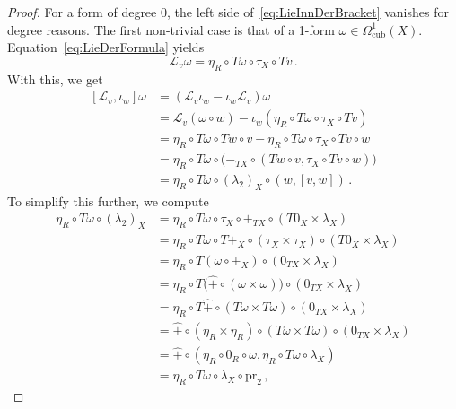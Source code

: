 \documentclass[12pt,reqno, a4paper]{amsart}
\numberwithin{equation}{section}
\theoremstyle{plain}
\theoremstyle{definition}
\theoremstyle{remark}
\newcommand{\pr}{\mathrm{pr}}
\newcommand{\Lie}{\mathcal{L}}
\newcommand{\Val}{\eta}
\newcommand{\Radd}{\hat{+}}
\begin{document}
\begin{proof}
For a form of degree $0$, the left side of~\eqref{eq:LieInnDerBracket} vanishes for degree reasons. The first non-trivial case is that of a 1-form $\omega \in \Omega^1_\mathrm{cub}(X)$. Equation~\eqref{eq:LieDerFormula} yields
\begin{equation*}
  \Lie_v \omega
  =  \Val_R \circ T\omega \circ \tau_X \circ Tv
  \,.
\end{equation*}
With this, we get
\begin{equation}
\label{eq:LieInnDerBrack03}
\begin{split}
  [\Lie_v, \iota_w]\omega
  &=
  (\Lie_v \iota_w - \iota_w \Lie_v)\omega
  \\
  &=
  \Lie_v (\omega \circ w)
  - \iota_w (\Val_R \circ T\omega \circ \tau_X \circ Tv)
  \\
  &=
    \Val_R \circ T\omega \circ Tw \circ v
  - \Val_R \circ T\omega \circ \tau_X \circ Tv \circ w
  \\
  &=
    \Val_R \circ T\omega \circ \bigl(
    -_{TX} \circ (Tw \circ v, \tau_X \circ Tv \circ w)
    \bigr)
  \\
  &=
    \Val_R \circ T\omega \circ (\lambda_2)_X \circ
    (w, [v,w])
  \,.
\end{split}
\end{equation}
To simplify this further, we compute
\begin{equation}
\label{eq:lambda2inForm}
\begin{split}
  \Val_R \circ T\omega \circ (\lambda_2)_X
  &=
  \Val_R \circ T\omega \circ
  \tau_X \circ +_{TX} \circ (T0_X \times \lambda_X)
  \\
  &=
  \Val_R \circ T\omega \circ
  {T+_X} \circ (\tau_X \times \tau_X) \circ
  (T0_X \times \lambda_X)
  \\
  &=
  \Val_R \circ T(\omega \circ +_X) \circ
  (0_{TX} \times \lambda_X)
  \\
  &=
  \Val_R \circ T\bigl(\Radd \circ (\omega \times \omega) \bigr)
  \circ (0_{TX} \times \lambda_X)
  \\
  &=
  \Val_R \circ T\Radd \circ (T\omega \times T\omega) \circ
  (0_{TX} \times \lambda_X)
  \\
  &=
  \Radd \circ (\Val_R \times \Val_R) \circ
  (T\omega \times T\omega) \circ
  (0_{TX} \times \lambda_X)
  \\
  &=
  \Radd \circ
  (\Val_R \circ 0_R \circ \omega,
   \Val_R \circ T\omega \circ \lambda_X)
  \\
  &=
  \Val_R \circ T\omega \circ \lambda_X \circ \pr_2
  \,,
\end{split}

\end{equation}
\end{proof}
\end{document}
